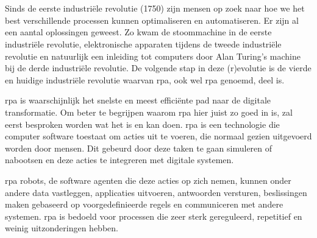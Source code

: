
\chapter{}
\label{ch:inleiding}
Sinds de eerste industriële revolutie (1750) zijn mensen op zoek naar hoe we het best verschillende processen kunnen optimaliseren en automatiseren. Er zijn al een aantal oplossingen geweest. Zo kwam de stoommachine in de eerste industriële revolutie, elektronische apparaten tijdens de tweede industriële revolutie en natuurlijk een inleiding tot computers door Alan Turing's machine bij de derde industriële revolutie. De volgende stap in deze (r)evolutie is de vierde en huidige industriële revolutie waarvan \acrlong{rpa}, ook wel \acrshort{rpa} genoemd, deel is. \autocite{indusRev}

\acrshort{rpa} is waarschijnlijk het snelste en meest efficiënte pad naar de digitale transformatie. Om beter te begrijpen waarom \acrshort{rpa} hier juist zo goed in is, zal eerst besproken worden wat het is en kan doen. \acrshort{rpa} is een technologie die computer software toestaat om acties uit te voeren, die normaal gezien uitgevoerd worden door mensen. Dit gebeurd door deze taken te gaan simuleren of nabootsen en deze acties te integreren met digitale systemen.

\acrshort{rpa} robots, de software agenten die deze acties op zich nemen, kunnen onder andere data vastleggen, applicaties uitvoeren, antwoorden versturen, beslissingen maken gebaseerd op voorgedefinieerde regels en communiceren met andere systemen. \acrshort{rpa} is bedoeld voor processen die zeer sterk gereguleerd, repetitief en weinig uitzonderingen hebben.

